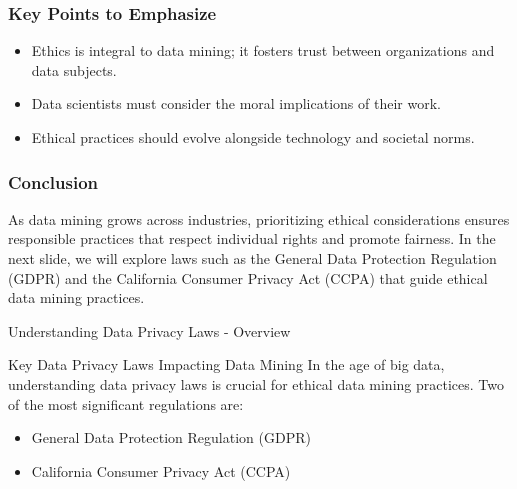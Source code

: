 \documentclass[aspectratio=169]{beamer}
\begin{document}
\begin{frame}[fragile]
    \frametitle{Key Points to Emphasize}
    \begin{itemize}
        \item Ethics is integral to data mining; it fosters trust between organizations and data subjects.
        \item Data scientists must consider the moral implications of their work.
        \item Ethical practices should evolve alongside technology and societal norms.
    \end{itemize}
\end{frame}

\begin{frame}[fragile]
    \frametitle{Conclusion}
    As data mining grows across industries, prioritizing ethical considerations ensures responsible practices that respect individual rights and promote fairness. In the next slide, we will explore laws such as the General Data Protection Regulation (GDPR) and the California Consumer Privacy Act (CCPA) that guide ethical data mining practices.
\end{frame}

\begin{frame}[fragile]{Understanding Data Privacy Laws - Overview}
  \begin{block}{Key Data Privacy Laws Impacting Data Mining}
    In the age of big data, understanding data privacy laws is crucial for ethical data mining practices. Two of the most significant regulations are:
    \begin{itemize}
      \item General Data Protection Regulation (GDPR)
      \item California Consumer Privacy Act (CCPA)
    \end{itemize}
  \end{block}
\end{frame}
\end{document}

